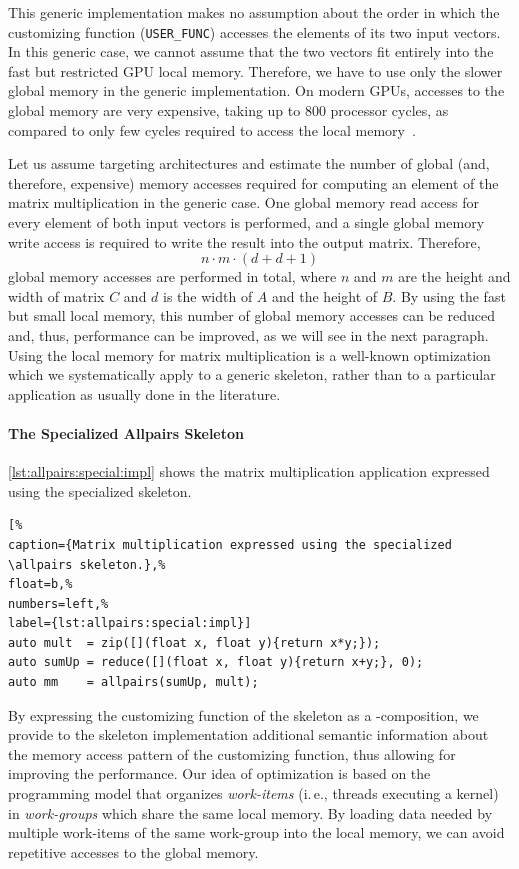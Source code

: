 This generic implementation makes no assumption about the order in which the customizing function (\texttt{USER\_FUNC}) accesses the elements of its two input vectors.
In this generic case, we cannot assume that the two vectors fit entirely into the fast but restricted GPU local memory.
Therefore, we have to use only the slower global memory in the generic implementation.
On modern GPUs, accesses to the global memory are very expensive, taking up to 800 processor cycles, as compared to only few cycles required to access the local memory~\cite{CUDAProgrammingGuide}.

Let us assume targeting \GPU architectures and estimate the number of global (and, therefore, expensive) memory accesses required for computing an element of the matrix multiplication in the generic case.
One global memory read access for every element of both input vectors is performed, and a single global memory write access is required to write the result into the output matrix.
Therefore, 
\begin{equation}
  n\cdot m\cdot (d + d + 1)
  \label{eq:mm:accesses}
\end{equation}
global memory accesses are performed in total, where $n$ and $m$ are the height and width of matrix $C$ and $d$ is the width of $A$ and the height of $B$.
By using the fast but small local memory, this number of global memory accesses can be reduced and, thus, performance can be improved, as we will see in the next paragraph.
Using the local memory for matrix multiplication is a well-known optimization which we systematically apply to a generic skeleton, rather than to a particular application as usually done in the literature.

\paragraph{The Specialized Allpairs Skeleton}
\autoref{lst:allpairs:special:impl} shows the matrix multiplication application expressed using the specialized \allpairs skeleton.
\begin{lstlisting}[%                                                             
caption={Matrix multiplication expressed using the specialized \allpairs skeleton.},%
float=b,%                                                                       
numbers=left,%
label={lst:allpairs:special:impl}]
auto mult  = zip([](float x, float y){return x*y;});
auto sumUp = reduce([](float x, float y){return x+y;}, 0);
auto mm    = allpairs(sumUp, mult);
\end{lstlisting}
%
By expressing the customizing function of the \allpairs skeleton as a \zip-\reduce composition, we provide to the skeleton implementation additional semantic information about the memory access pattern of the customizing function, thus allowing for improving the performance.
Our idea of optimization is based on the \OpenCL programming model that organizes \emph{work-items} (i.\,e., threads executing a kernel) in \emph{work-groups} which share the same \GPU local memory.
By loading data needed by multiple work-items of the same work-group into the local memory, we can avoid repetitive accesses to the global memory.

